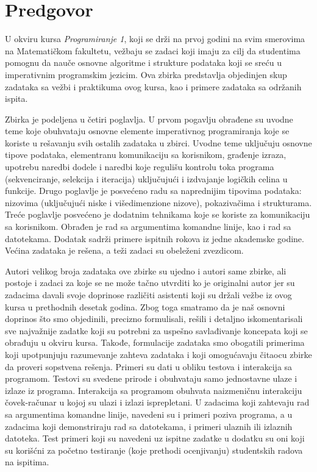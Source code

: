 \chapter*{Predgovor}

U okviru kursa {\em Programiranje 1}, koji se drži na prvoj godini na svim smerovima na Matematičkom fakultetu, vežbaju se zadaci koji imaju za cilj da studentima pomognu da nauče osnovne algoritme i strukture podataka koji se sreću u imperativnim programskim jezicim. Ova zbirka predstavlja objedinjen skup zadataka sa vežbi i praktikuma ovog kursa, kao i primere zadataka sa održanih ispita. 

Zbirka je podeljena u četiri poglavlja. U prvom pogavlju obrađene su uvodne teme koje obuhvataju osnovne elemente imperativnog programiranja koje se koriste u rešavanju svih ostalih zadataka u zbirci. Uvodne teme uključuju osnovne tipove podataka, elementranu komunikaciju sa korisnikom, građenje izraza, upotrebu naredbi dodele i naredbi koje regulišu kontrolu toka programa (sekvenciranje, selekcija i iteracija) uključujući i izdvajanje logičkih celina u funkcije. Drugo poglavlje je posvećeno radu sa naprednijim tipovima podataka: nizovima (uključujući niske i višedimenzione nizove), pokazivačima i strukturama. Treće poglavlje posvećeno je dodatnim tehnikama koje se koriste za komunikaciju sa korisnikom. Obrađen je rad sa argumentima komandne linije, kao i rad sa datotekama. Dodatak sadrži primere ispitnih rokova iz jedne akademske godine. Većina zadataka je rešena, a teži zadaci su obeleženi zvezdicom.

Autori velikog broja zadataka ove zbirke su ujedno i autori same zbirke, ali postoje 
i zadaci za koje se ne može tačno utvrditi ko je originalni autor jer su zadacima 
davali svoje doprinose različiti asistenti koji su držali vežbe iz ovog kursa u 
prethodnih desetak godina. Zbog toga smatramo da je naš osnovni doprinos 
što smo objedinili, precizno formulisali, rešili i detaljno iskomentarisali 
sve najvažnije zadatke koji su potrebni za uspešno savlađivanje koncepata 
koji se obrađuju u okviru kursa. Takođe, formulacije zadataka smo obogatili
primerima koji upotpunjuju razumevanje zahteva zadataka i koji omogućavaju
čitaocu zbirke da proveri sopstvena rešenja. Primeri su dati u obliku 
testova i interakcija sa programom. Testovi su svedene prirode i obuhvataju 
samo jednostavne ulaze i izlaze iz programa. Interakcija sa programom obuhvata 
naizmeničnu interakciju čovek-računar u kojoj su ulazi i izlazi isprepletani. U zadacima koji zahtevaju rad sa argumentima komandne linije, navedeni su i primeri poziva programa, a u zadacima koji demonstriraju rad sa datotekama, i primeri ulaznih ili izlaznih datoteka. Test primeri koji su navedeni uz ispitne zadatke u dodatku su oni koji su korišćni za početno testiranje (koje prethodi ocenjivanju) studentskih radova na ispitima.


